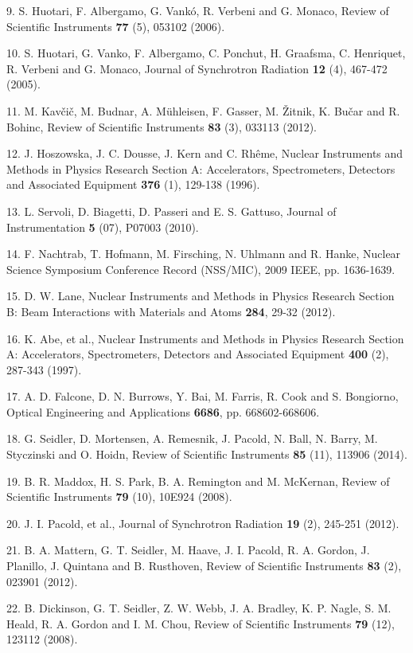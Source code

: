 9. S. Huotari, F. Albergamo, G. Vankó, R.
Verbeni and G. Monaco, Review of Scientific Instruments \textbf{77} (5),
053102 (2006).

10. S. Huotari, G. Vanko, F. Albergamo,
C. Ponchut, H. Graafsma, C. Henriquet, R. Verbeni and G. Monaco, Journal
of Synchrotron Radiation \textbf{12} (4), 467-472 (2005).

11. M. Kavčič, M. Budnar, A. Mühleisen,
F. Gasser, M. Žitnik, K. Bučar and R. Bohinc, Review of Scientific
Instruments \textbf{83} (3), 033113 (2012).

12. J. Hoszowska, J. C. Dousse, J. Kern
and C. Rhême, Nuclear Instruments and Methods in Physics Research
Section A: Accelerators, Spectrometers, Detectors and Associated
Equipment \textbf{376} (1), 129-138 (1996).

13. L. Servoli, D. Biagetti, D. Passeri
and E. S. Gattuso, Journal of Instrumentation \textbf{5} (07), P07003
(2010).

14. F. Nachtrab, T. Hofmann, M.
Firsching, N. Uhlmann and R. Hanke, Nuclear Science Symposium Conference
Record (NSS/MIC), 2009 IEEE, pp. 1636-1639.

15. D. W. Lane, Nuclear Instruments and
Methods in Physics Research Section B: Beam Interactions with Materials
and Atoms \textbf{284}, 29-32 (2012).

16. K. Abe, et al., Nuclear Instruments
and Methods in Physics Research Section A: Accelerators, Spectrometers,
Detectors and Associated Equipment \textbf{400} (2), 287-343 (1997).

17. A. D. Falcone, D. N. Burrows, Y.
Bai, M. Farris, R. Cook and S. Bongiorno, Optical Engineering and
Applications \textbf{6686}, pp. 668602-668606.

18. G. Seidler, D. Mortensen, A.
Remesnik, J. Pacold, N. Ball, N. Barry, M. Styczinski and O. Hoidn,
Review of Scientific Instruments \textbf{85} (11), 113906 (2014).

19. B. R. Maddox, H. S. Park, B. A.
Remington and M. McKernan, Review of Scientific Instruments \textbf{79}
(10), 10E924 (2008).

20. J. I. Pacold, et al., Journal of
Synchrotron Radiation \textbf{19} (2), 245-251 (2012).

21. B. A. Mattern, G. T. Seidler, M.
Haave, J. I. Pacold, R. A. Gordon, J. Planillo, J. Quintana and B.
Rusthoven, Review of Scientific Instruments \textbf{83} (2), 023901
(2012).

22. B. Dickinson, G. T. Seidler, Z. W.
Webb, J. A. Bradley, K. P. Nagle, S. M. Heald, R. A. Gordon and I. M.
Chou, Review of Scientific Instruments \textbf{79} (12), 123112 (2008).
